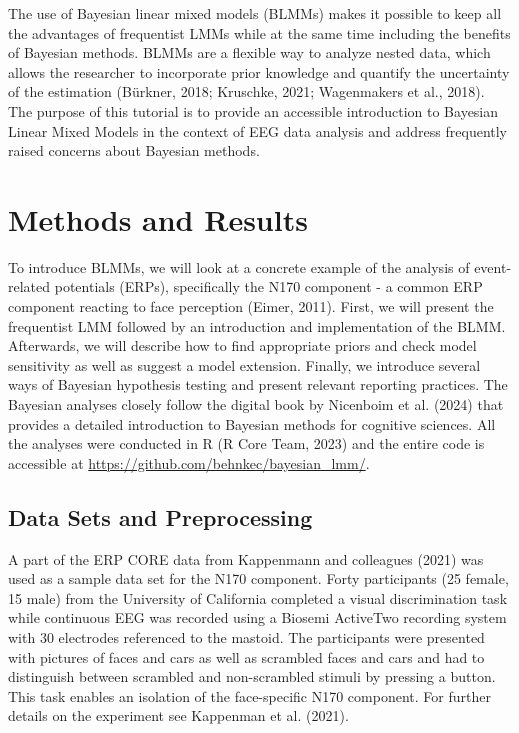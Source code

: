 \documentclass[
  doc,12pt,floatsintext]{apa7}
\begin{document}
The use of Bayesian linear mixed models (BLMMs) makes it possible to keep all the advantages of frequentist LMMs while at the same time including the benefits of Bayesian methods. BLMMs are a flexible way to analyze nested data, which allows the researcher to incorporate prior knowledge and quantify the uncertainty of the estimation (Bürkner, 2018; Kruschke, 2021; Wagenmakers et al., 2018). The purpose of this tutorial is to provide an accessible introduction to Bayesian Linear Mixed Models in the context of EEG data analysis and address frequently raised concerns about Bayesian methods.

\section{Methods and Results}\label{methods-and-results}

To introduce BLMMs, we will look at a concrete example of the analysis of event-related potentials (ERPs), specifically the N170 component - a common ERP component reacting to face perception (Eimer, 2011). First, we will present the frequentist LMM followed by an introduction and implementation of the BLMM. Afterwards, we will describe how to find appropriate priors and check model sensitivity as well as suggest a model extension. Finally, we introduce several ways of Bayesian hypothesis testing and present relevant reporting practices. The Bayesian analyses closely follow the digital book by Nicenboim et al. (2024) that provides a detailed introduction to Bayesian methods for cognitive sciences. All the analyses were conducted in R (R Core Team, 2023) and the entire code is accessible at \url{https://github.com/behnkec/bayesian_lmm/}.

\subsection{Data Sets and Preprocessing}\label{data-sets-and-preprocessing}

A part of the ERP CORE data from Kappenmann and colleagues (2021) was used as a sample data set for the N170 component. Forty participants (25 female, 15 male) from the University of California completed a visual discrimination task while continuous EEG was recorded using a Biosemi ActiveTwo recording system with 30 electrodes referenced to the mastoid. The participants were presented with pictures of faces and cars as well as scrambled faces and cars and had to distinguish between scrambled and non-scrambled stimuli by pressing a button. This task enables an isolation of the face-specific N170 component. For further details on the experiment see Kappenman et al. (2021).
\end{document}
